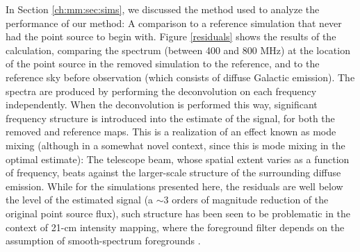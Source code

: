 In Section \ref{ch:mm:sec:sims}, we discussed the method used to analyze the performance of our method: A comparison to a reference simulation that never had the point source to begin with. Figure \ref{residuals} shows the results of the calculation, comparing the spectrum (between 400 and 800 MHz) at the location of the point source in the removed simulation to the reference, and to the reference sky before observation (which consists of diffuse Galactic emission). The spectra are produced by performing the deconvolution on each frequency independently. When the deconvolution is performed this way, significant frequency structure is introduced into the estimate of the signal, for both the removed and reference maps. This is a realization of an effect known as mode mixing (although in a somewhat novel context, since this is mode mixing in the optimal estimate): The telescope beam, whose spatial extent varies as a function of frequency, beats against the larger-scale structure of the surrounding diffuse emission. While for the simulations presented here, the residuals are well below the level of the estimated signal (a $\sim 3$ orders of magnitude reduction of the original point source flux), such structure has been seen to be problematic in the context of 21-cm intensity mapping, where the foreground filter depends on the assumption of smooth-spectrum foregrounds \citep{barry2016}.

